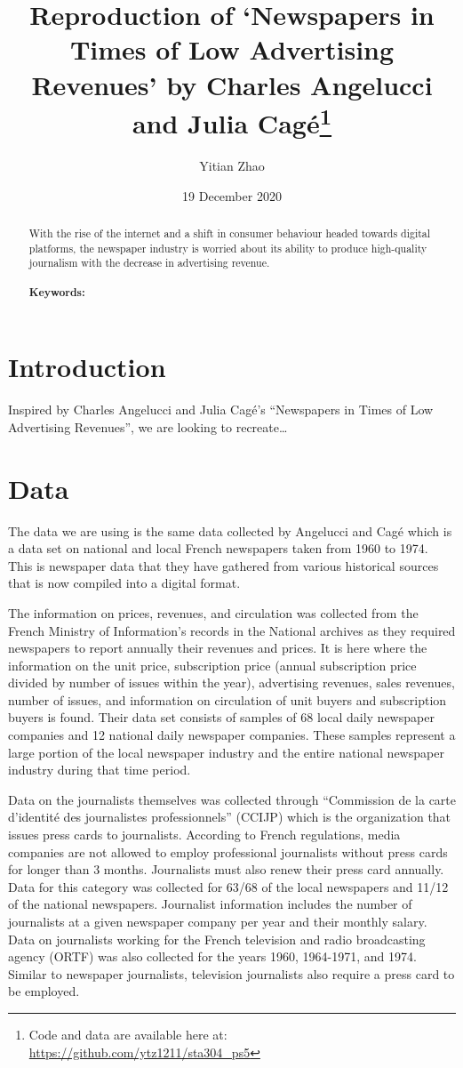 \documentclass[
]{article}
\title{Reproduction of `Newspapers in Times of Low Advertising Revenues' by Charles Angelucci and Julia Cagé\thanks{Code and data are available here at: \url{https://github.com/ytz1211/sta304_ps5}}}
\author{Yitian Zhao}
\date{19 December 2020}
\begin{document}
\maketitle
\begin{abstract}
With the rise of the internet and a shift in consumer behaviour headed towards digital platforms, the newspaper industry is worried about its ability to produce high-quality journalism with the decrease in advertising revenue.\\
~\\
\textbf{Keywords: }
\end{abstract}

\hypertarget{introduction}{%
\section{Introduction}\label{introduction}}

Inspired by Charles Angelucci and Julia Cagé's ``Newspapers in Times of Low Advertising Revenues'', we are looking to recreate\ldots{}

\hypertarget{data}{%
\section{Data}\label{data}}

The data we are using is the same data collected by Angelucci and Cagé which is a data set on national and local French newspapers taken from 1960 to 1974. This is newspaper data that they have gathered from various historical sources that is now compiled into a digital format.

The information on prices, revenues, and circulation was collected from the French Ministry of Information's records
in the National archives as they required newspapers to report annually their revenues and prices. It is here where the information on the unit price, subscription price (annual subscription price divided by number of issues within the year), advertising revenues, sales revenues, number of issues, and information on circulation of unit buyers and subscription buyers is found. Their data set consists of samples of 68 local daily newspaper companies and 12 national daily newspaper companies. These samples represent a large portion of the local newspaper industry and the entire national newspaper industry during that time period.

Data on the journalists themselves was collected through ``Commission de la carte d'identité des journalistes professionnels'' (CCIJP) which is the organization that issues press cards to journalists. According to French regulations, media companies are not allowed to employ professional journalists without press cards for longer than 3 months. Journalists must also renew their press card annually. Data for this category was collected for 63/68 of the local newspapers and 11/12 of the national newspapers. Journalist information includes the number of journalists at a given newspaper company per year and their monthly salary. Data on journalists working for the French television and radio broadcasting agency (ORTF) was also collected for the years 1960, 1964-1971, and 1974. Similar to newspaper journalists, television journalists also require a press card to be employed.
\end{document}

